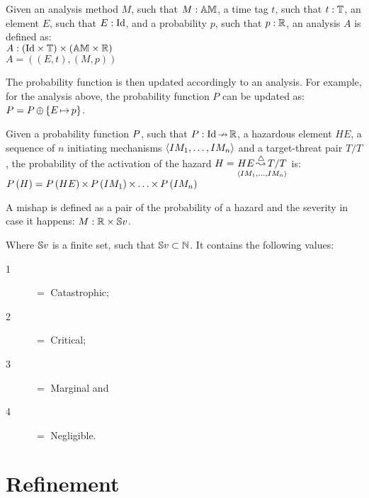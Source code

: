 \begin{definition}[Analysis]
Given an analysis method $M$, such that $M: \hmdatatypeAM$, a time tag $t$, such that $t:\hmdatatypetimetag$, an element $E$, such that $E:\hmdatatypeId$, and a probability $p$, such that $p:\hmdatatypeR$, an analysis $A$ is defined as:
%
\\$A: \hmcartesian{\left(\hmcartesian{\hmdatatypeId}{\hmdatatypetimetag}\right)}{\left(\hmcartesian{\hmdatatypeAM}{\hmdatatypeR}\right)}$
%
\\$A = \left(\left(E, t\right), \left(M, p\right) \right)$

\end{definition}
The probability function is then updated accordingly to an analysis. For example, for the analysis above, the probability function $P$ can be updated as:
$\hmprobabilitysymbol = \hmoverride{\hmprobabilitysymbol}{\left\{\hmmapsto{E}{p}\right\}}$.

\begin{definition}
Given a probability function $\hmprobabilitysymbol$, such that $P: \hmpartialfunction {\hmdatatypeId}{\hmdatatypeR}$, a hazardous element $HE$, a sequence of $n$ initiating mechanisms $\hmseqenum{IM_1,\ldots,IM_n}$ and a target-threat pair $T/T$, the probability of the activation of the hazard $H = \hmhazard{HE}{\hmseqenum{IM_1,\ldots,IM_n}}{T/T}$ is:
%
\\$\hmprobability{H} = \hmtimes{\hmprobability{HE}}{\hmtimes{\hmtimes{\hmprobability{IM_1}}{\ldots}}{\hmprobability{IM_n}}}$
\end{definition}

\begin{definition}[Mishap]
A mishap is defined as a pair of the probability of a hazard and the severity in case it happens: $M: \hmcartesian{\hmdatatypeR}{\hmdatatypeseverity}$.
\end{definition}
%
\noindent Where $\hmdatatypeseverity$ is a finite set, such that $\hmdatatypeseverity \subset \hmdatatypeN$. It contains the following values:
\begin{description}
  \item[1] $=$ Catastrophic;
  \item[2] $=$ Critical;
  \item[3] $=$ Marginal and
  \item[4] $=$ Negligible.
\end{description}

\section{Refinement}


